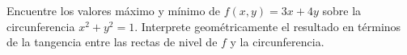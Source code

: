 Encuentre los valores máximo y mínimo de $f(x, y) = 3x + 4y$ sobre la circunferencia $x^2 + y^2 = 1$. Interprete geométricamente el resultado en términos de la tangencia entre las rectas de nivel de $f$ y la circunferencia.
